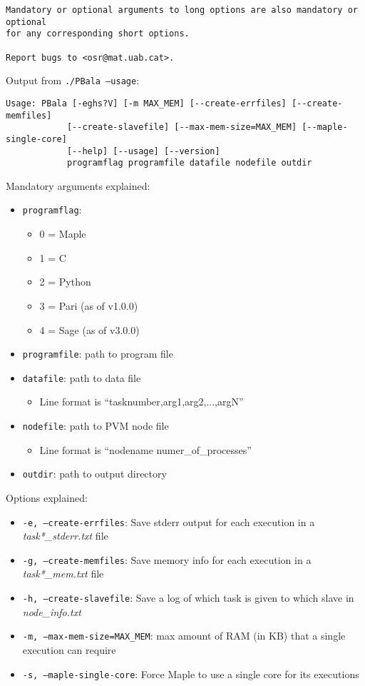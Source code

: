 \begin{appendices}
\begin{lstlisting}[style=plainbash]
Mandatory or optional arguments to long options are also mandatory or optional
for any corresponding short options.

Report bugs to <osr@mat.uab.cat>.
\end{lstlisting}


Output from \texttt{./PBala --usage}:
\begin{lstlisting}[style=plainbash]
Usage: PBala [-eghs?V] [-m MAX_MEM] [--create-errfiles] [--create-memfiles]
            [--create-slavefile] [--max-mem-size=MAX_MEM] [--maple-single-core]
            [--help] [--usage] [--version]
            programflag programfile datafile nodefile outdir
\end{lstlisting}

Mandatory arguments explained:
\begin{itemize}
\item
\texttt{programflag}:
\begin{itemize}
\item
0 = Maple
\item
1 = C
\item
2 = Python
\item
3 = Pari (as of v1.0.0)
\item
4 = Sage (as of v3.0.0)
\end{itemize}
\item
\texttt{programfile}: path to program file
\item
\texttt{datafile}: path to data file
\begin{itemize}
\item
Line format is ``tasknumber,arg1,arg2,...,argN''
\end{itemize}
\item
\texttt{nodefile}: path to PVM node file
\begin{itemize}
\item
Line format is ``nodename numer\_of\_processes''
\end{itemize}
\item
\texttt{outdir}: path to output directory
\end{itemize}

Options explained:
\begin{itemize}
\item
\texttt{-e, --create-errfiles}: Save stderr output for each execution in a \emph{task*\_stderr.txt} file
\item
\texttt{-g, --create-memfiles}: Save memory info for each execution in a \emph{task*\_mem.txt} file
\item
\texttt{-h, --create-slavefile}: Save a log of which task is given to which slave in \emph{node\_info.txt}
\item
\texttt{-m, --max-mem-size=MAX\_MEM}: max amount of RAM (in KB) that a single execution can require
\item
\texttt{-s, --maple-single-core}: Force Maple to use a single core for its executions
\end{itemize}


\end{appendices}
